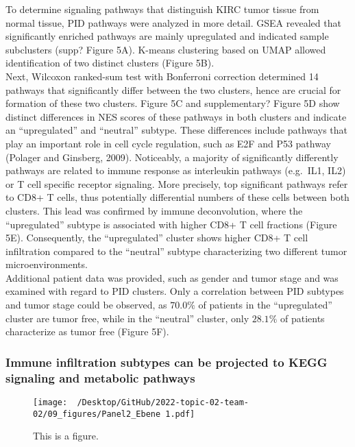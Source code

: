 \documentclass[
  parskip,
  oneside]{scrreprt}
\begin{document}
To determine signaling pathways that distinguish KIRC tumor tissue from
normal tissue, PID pathways were analyzed in more detail. GSEA revealed
that significantly enriched pathways are mainly upregulated and
indicated sample subclusters (supp? Figure 5A). K-means clustering based
on UMAP allowed identification of two distinct clusters (Figure 5B).\\
Next, Wilcoxon ranked-sum test with Bonferroni correction determined 14
pathways that significantly differ between the two clusters, hence are
crucial for formation of these two clusters. Figure 5C and
supplementary? Figure 5D show distinct differences in NES scores of
these pathways in both clusters and indicate an ``upregulated'' and
``neutral'' subtype. These differences include pathways that play an
important role in cell cycle regulation, such as E2F and P53 pathway
(Polager and Ginsberg, 2009). Noticeably, a majority of significantly
differently pathways are related to immune response as interleukin
pathways (e.g.~IL1, IL2) or T cell specific receptor signaling. More
precisely, top significant pathways refer to CD8+ T cells, thus
potentially differential numbers of these cells between both clusters.
This lead was confirmed by immune deconvolution, where the
``upregulated'' subtype is associated with higher CD8+ T cell fractions
(Figure 5E). Consequently, the ``upregulated'' cluster shows higher CD8+
T cell infiltration compared to the ``neutral'' subtype characterizing
two different tumor microenvironments.\\
Additional patient data was provided, such as gender and tumor stage and
was examined with regard to PID clusters. Only a correlation between PID
subtypes and tumor stage could be observed, as \(70.0\%\) of patients in
the ``upregulated'' cluster are tumor free, while in the ``neutral''
cluster, only \(28.1\%\) of patients characterize as tumor free (Figure
5F).

\hypertarget{immune-infiltration-subtypes-can-be-projected-to-kegg-signaling-and-metabolic-pathways}{%
\subsubsection{Immune infiltration subtypes can be projected to KEGG
signaling and metabolic
pathways}\label{immune-infiltration-subtypes-can-be-projected-to-kegg-signaling-and-metabolic-pathways}}

\begin{figure}
  \texttt{[image: ~/Desktop/GitHub/2022-topic-02-team-02/09\_figures/Panel2\_Ebene 1.pdf]}
  \caption{This is a figure.}
\end{figure}
\end{document}
